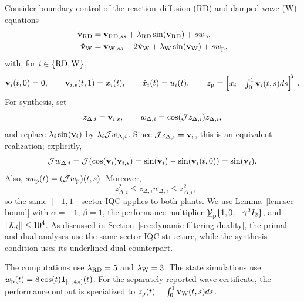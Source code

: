 Consider boundary control of the reaction--diffusion (RD) and damped wave
(W) equations
\begin{align*}
 \dot{\mathbf{v}}_{{\mathrm{RD}}}
   &=\mathbf{v}_{{\mathrm{RD}},ss}
     +\lambda_{{\mathrm{RD}}}\sin(\mathbf{v}_{{\mathrm{RD}}})+s w_{{\mathrm{p}}},\\
 \ddot{\mathbf{v}}_{{\mathrm{W}}}
   &=\mathbf{v}_{{\mathrm{W}},ss}-2\dot{\mathbf{v}}_{{\mathrm{W}}}
     +\lambda_{{\mathrm{W}}}\sin(\mathbf{v}_{{\mathrm{W}}})+s w_{{\mathrm{p}}},
\end{align*}
with, for $i\in\{{\mathrm{RD}},{\mathrm{W}}\}$,
\begin{equation*}
 \mathbf{v}_i(t,0)=0,\qquad \mathbf{v}_{i,s}(t,1)=x_i(t),\qquad
 \dot x_i(t)=u_i(t),\qquad
 z_{{\mathrm{p}}}=\begin{bmatrix}x_i&\int_0^1\mathbf{v}_i(t,s)ds\end{bmatrix}^{\!T}.
\end{equation*}
For synthesis, set
\begin{equation*}
 z_{\Delta,i}=\mathbf{v}_{i,s},\qquad
 w_{\Delta,i}=\cos(\mathcal{J}z_{\Delta,i})z_{\Delta,i},
\end{equation*}
and replace $\lambda_i\sin(\mathbf{v}_i)$ by
$\lambda_i\mathcal{J}w_{\Delta,i}$. Since $\mathcal{J}z_{\Delta,i}=\mathbf{v}_i$,
this is an equivalent realization; explicitly,
\begin{equation*}
 \mathcal{J}w_{\Delta,i}
 =\mathcal{J}\!\left(\cos(\mathbf{v}_i)\mathbf{v}_{i,s}\right)
 =\sin(\mathbf{v}_i)-\sin(\mathbf{v}_i(t,0))=\sin(\mathbf{v}_i).
\end{equation*}
Also, $s w_{{\mathrm{p}}}(t)=(\mathcal{J}w_{{\mathrm{p}}})(t,s)$. Moreover,
\begin{equation*}
 -z_{\Delta,i}^2\leq z_{\Delta,i}w_{\Delta,i}
 \leq z_{\Delta,i}^2,
\end{equation*}
so the same $[-1,1]$ sector IQC applies to both plants. We use
Lemma~\ref{lem:sec-bound} with $\alpha=-1$, $\beta=1$, the performance
multiplier $\underline{\mathcal{V}}_{{\mathrm{p}}}\{1,0,-\gamma^2I_2\}$, and
$\|\mathcal{K}_i\|\leq10^4$. As discussed in
Section~\ref{sec:dynamic-filtering-duality}, the primal and dual analyses
use the same sector-IQC structure, while the synthesis condition uses its
underlined dual counterpart.

The computations use $\lambda_{{\mathrm{RD}}}=5$ and $\lambda_{{\mathrm{W}}}=3$. The
state simulations use
$w_{{\mathrm{p}}}(t)=8\cos(t)\mathbf 1_{[\pi,4\pi]}(t)$. For the separately
reported wave certificate, the performance output is specialized to
$z_{{\mathrm{p}}}(t)=\int_0^1\mathbf{v}_{{\mathrm{W}}}(t,s)ds$.


